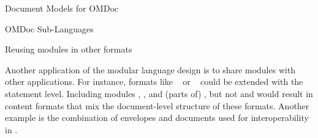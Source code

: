 \begin{tchapter}[id=document-model]{Document Models for OMDoc}
\begin{tsection}[id=sub-languages]{OMDoc Sub-Languages}
\begin{tsubsection}[id=spec-intro:reusing]{Reusing {\omdoc} modules in other formats}
  
  Another application of the modular language design is to share modules with other {\xml}
  applications. For instance, formats like
  {\docbook}~\cite{WalMue:dtdg99} or {\xhtml}~\cite{W3C:xhtml2000} could be extended with
  the {\omdoc} statement level.  Including modules {}, {},
  and (parts of) {}, but not {} and {}
  would result in content formats that mix the document-level structure of these formats.
  Another example is the combination of {\xmlrpc} envelopes and {\omdoc} documents used
  for interoperability in {}.
\end{tsubsection}
\end{tsection}

\end{tchapter}


